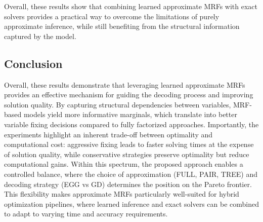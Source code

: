 Overall, these results show that combining learned approximate MRFs with exact solvers provides a practical way to overcome the limitations of purely approximate inference, while still benefiting from the structural information captured by the model.

\subsection{Conclusion}
Overall, these results demonstrate that leveraging learned approximate MRFs provides an effective mechanism for guiding the decoding process and improving solution quality. By capturing structural dependencies between variables, MRF-based models yield more informative marginals, which translate into better variable fixing decisions compared to fully factorized approaches. Importantly, the experiments highlight an inherent trade-off between optimality and computational cost: aggressive fixing leads to faster solving times at the expense of solution quality, while conservative strategies preserve optimality but reduce computational gains. Within this spectrum, the proposed approach enables a controlled balance, where the choice of approximation (FULL, PAIR, TREE) and decoding strategy (EGG vs GD) determines the position on the Pareto frontier. This flexibility makes approximate MRFs particularly well-suited for hybrid optimization pipelines, where learned inference and exact solvers can be combined to adapt to varying time and accuracy requirements.